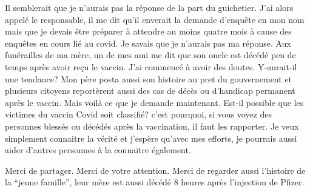 {Il semblerait que je n'aurais pas la réponse de la part du guichetier. J'ai
alors appelé le responsable, il me dit qu'il enverait la demande d'enquête en
mon nom mais que je devais être préparer à attendre au moins quatre mois à cause
des enquêtes en cours lié au covid. Je savais que je n'aurais pas ma
réponse. Aux funérailles de ma mère, un de mes ami me dit que son oncle est
décédé peu de temps après avoir reçu le vaccin. J'ai commencé à avoir des
doutes. Y-aurait-il une tendance? Mon père posta aussi son histoire au pret du
gouvernement et plusieurs citoyens reportèrent aussi des cas de décès ou
d'handicap permanent après le vaccin. Mais voilà ce que je demande
maintenant. Est-il possible que les victimes du vaccin Covid soit classifié?
c'est pourquoi, si vous voyez des personnes blessés ou décédés après la
vaccination, il faut les rapporter. Je veux simplement connaitre la vérité et
j'espère qu'avec mes efforts, je pourrais aussi aider d'autres personnes à la
connaitre également.

Merci de partager. Merci de votre attention. Merci de regarder aussi l'histoire
de la “jeune famille”, leur mère est aussi décédé 8 heures après l'injection de
Pfizer.

}
